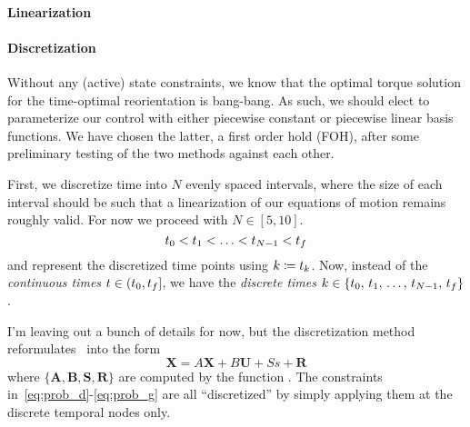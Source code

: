 \documentclass[12pt]{article}
\begin{document}
\paragraph{Linearization}



\paragraph{Discretization}

Without any (active) state constraints, we know that the optimal torque solution for the time-optimal reorientation is bang-bang. As such, we should elect to parameterize our control with either piecewise constant or piecewise linear basis functions. We have chosen the latter, a first order hold (FOH), after some preliminary testing of the two methods against each other. 


First, we discretize time into $N$ evenly spaced intervals, where the size of each interval should be such that a linearization of our equations of motion remains roughly valid. For now we proceed with $N\in[5,10]$. 
\begin{equation}
t_0 < t_1 < \ldots < t_{N-1} < t_f
\end{equation}
and represent the discretized time points using $k \coloneqq t_k$. Now, instead of the \textit{continuous times} $t\in(t_0,t_f]$, we have the \textit{discrete times} $k\in\{t_0,\,t_1,\,\ldots,\,t_{N-1},\,t_f\}$.

I'm leaving out a bunch of details for now, but the discretization method reformulates~ into the form
\begin{equation}
\bm{X} = A \bm{X} + B \bm{U} + S s + \bm{R}
\label{eq:discrete_dynamics}
\end{equation}
where $\{\bm{A},\bm{B},\bm{S},\bm{R}\}$ are computed by the function . The constraints in~\eqref{eq:prob_d}-\eqref{eq:prob_g} are all ``discretized'' by simply applying them at the discrete temporal nodes only. 
\end{document}

